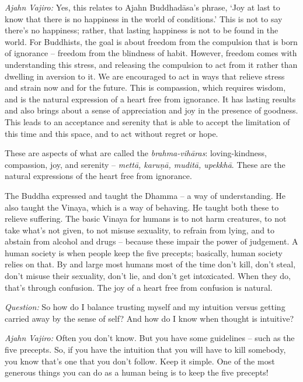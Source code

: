 \emph{Ajahn Vajiro:} Yes, this relates to Ajahn Buddhadāsa's phrase, `Joy at last to
know that there is no happiness in the world of conditions.' This is not to say there's no
happiness; rather, that lasting happiness is not to be found in the world. For
Buddhists, the goal is about freedom from the compulsion that is born of
ignorance -- freedom from the blindness of habit. However, freedom comes with
understanding this stress, and releasing the compulsion to act from it rather
than dwelling in aversion to it. We are encouraged to act in ways that relieve
stress and strain now and for the future. This is compassion, which requires
wisdom, and is the natural expression of a heart free from ignorance. It has
lasting results and also brings about a sense of appreciation and joy in the
presence of goodness. This leads to an acceptance and serenity that is able to
accept the limitation of this time and this space, and to act without regret or
hope.

These are aspects of what are called the \emph{brahma-vihāras}: loving-kindness,
compassion, joy, and serenity -- \emph{mettā, karuṇā, muditā, upekkhā}. These
are the natural expressions of the heart free from ignorance.

The Buddha expressed and taught the Dhamma -- a way of understanding. He also
taught the Vinaya, which is a way of behaving. He taught both these to relieve
suffering. The basic Vinaya for humans is to not harm creatures, to not take
what's not given, to not misuse sexuality, to refrain from lying, and to abstain
from alcohol and drugs -- because these impair the power of judgement. A human
society is when people keep the five precepts; basically, human society relies
on that. By and large most humans most of the time don't kill, don't steal, don't misuse their
sexuality, don't lie, and don't get intoxicated. When they do, that's through
confusion. The joy of a heart free from confusion is natural.

\emph{Question:} So how do I balance trusting myself and my intuition versus getting
carried away by the sense of self? And how do I know when thought is intuitive?

\emph{Ajahn Vajiro:} Often you don't know. But you have some guidelines -- such as the
five precepts. So, if you have the intuition that you will have to kill
somebody, you know that's one that you don't follow. Keep it simple. One of the
most generous things you can do as a human being is to keep the five precepts!

